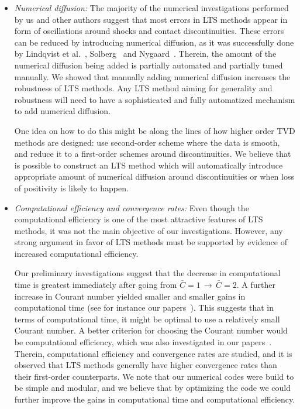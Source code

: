 \begin{itemize}
\item \textit{Numerical diffusion:} The majority of the numerical investigations performed by us and other authors suggest that most errors in LTS methods appear in form of oscillations around shocks and contact discontinuities. These errors can be reduced by introducing numerical diffusion, as it was successfully done by Lindqvist et al.~\cite{lin16}, Solberg~\cite{sol16} and Nygaard~\cite{nyg17}. Therein, the amount of the numerical diffusion being added is partially automated and partially tuned manually. We showed that manually adding numerical diffusion increases the robustness of LTS methods. Any LTS method aiming for generality and robustness will need to have a sophisticated and fully automatized mechanism to add numerical diffusion. 

One idea on how to do this might be along the lines of how higher order TVD methods are designed: use second-order scheme where the data is smooth, and reduce it to a first-order schemes around discontinuities. We believe that is possible to construct an LTS method which will automatically introduce appropriate amount of numerical diffusion around discontinuities or when loss of positivity is likely to happen.

\item \textit{Computational efficiency and convergence rates:} Even though the computational efficiency is one of the most attractive features of LTS methods, it was not the main objective of our investigations. However, any strong argument in favor of LTS methods must be supported by evidence of increased computational efficiency. 

Our preliminary investigations suggest that the decrease in computational time is greatest immediately after going from $ \bar{C}=1 \, \rightarrow \, \bar{C}=2 $. A further increase in Courant number yielded smaller and smaller gains in computational time (see for instance our papers~\cite{jp1,jp2,cp1}). This suggests that in terms of computational time, it might be optimal to use a relatively small Courant number. A better criterion for choosing the Courant number would be computational efficiency, which was also investigated in our papers~\cite{jp1,jp2}. Therein, computational efficiency and convergence rates are studied, and it is observed that LTS methods generally have higher convergence rates than their first-order counterparts. We note that our numerical codes were build to be simple and modular, and we believe that by optimizing the code we could further improve the gains in computational time and computational efficiency.


\end{itemize}
